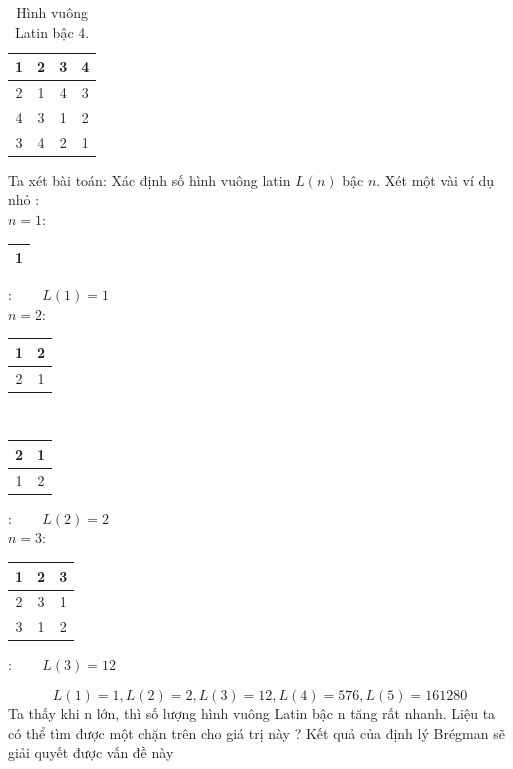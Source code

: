 \documentclass[a4paper, 12pt]{report}
\begin{document}
\begin{table}[ht]
\centering
\begin{tabular}{|c|c|c|c|}
    \hline
     1&2&3&4  \\ \hline
     2&1&4&3  \\ \hline
     4&3&1&2  \\ \hline
     3&4&2&1  \\
     \hline
\end{tabular}
\caption{Hình vuông Latin bậc 4.}
\end{table}%

Ta xét bài toán: Xác định số hình vuông latin $L(n)$ bậc $n$. Xét một vài ví dụ nhỏ :\\
$n=1$:
\begin{tabular}{|c|}
    \hline
     1 \\ \hline
    
\end{tabular}: ~~~ $L(1) = 1$
\vspace{20pt}
\\
$n=2$:
\begin{tabular}{|c|c|}
    \hline
     1&2 \\ \hline
     2&1 \\ 
     \hline
\end{tabular} ~~~ \begin{tabular}{|c|c|}
    \hline
     2&1 \\ \hline
     1&2 \\ 
     \hline
\end{tabular}: ~~~ $L(2) = 2$
\vspace{20pt}
\\
$n=3$:
\begin{tabular}{|c|c|c|}
	\hline
	1&2&3 \\ \hline
	2&3&1 \\ \hline
	3&1&2 \\
	\hline
\end{tabular}: ~~~ $L(3) = 12$

\begin{equation*}
L(1) = 1, L(2) = 2, L(3) = 12, L(4) = 576, L(5) = 161280
\end{equation*}
Ta thấy khi n lớn, thì số lượng hình vuông Latin bậc n tăng rất nhanh. Liệu ta có thể tìm được một chặn trên cho giá trị này ? Kết quả của định lý Brégman sẽ giải quyết được vấn đề này
\end{document}
